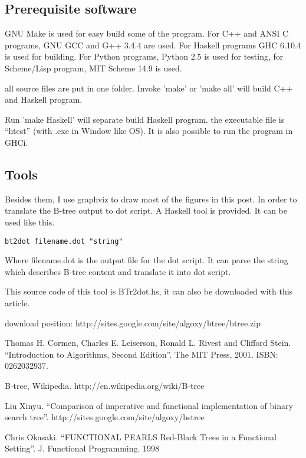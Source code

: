\documentclass{article}
\begin{document}
\subsection{Prerequisite software}
GNU Make is used for easy build some of the program. For C++ and ANSI C programs,
GNU GCC and G++ 3.4.4 are used. 
For Haskell programs GHC 6.10.4 is used
for building. For Python programs, Python 2.5 is used for testing, for
Scheme/Lisp program, MIT Scheme 14.9 is used.

all source files are put in one folder. Invoke 'make' or 'make all'
will build C++ and Haskell program. 

Run 'make Haskell' will separate build Haskell program. the executable
file is ``htest'' (with .exe
in Window like OS). It is also possible to run the program in GHCi.

\subsection{Tools}

Besides them, I use graphviz to draw most of the figures in this post. In order to
translate the B-tree output to dot script. A Haskell tool is provided.
It can be used like this.

\begin{verbatim}
bt2dot filename.dot "string"
\end{verbatim}

Where filename.dot is the output file for the dot script. It can
parse the string which describes B-tree content and translate it 
into dot script.

This source code of this tool is BTr2dot.hs, it can also be downloaded 
with this article.

download position: http://sites.google.com/site/algoxy/btree/btree.zip

\begin{thebibliography}{99}

Thomas H. Cormen, Charles E. Leiserson, Ronald L. Rivest and Clifford Stein. ``Introduction to Algorithms, Second Edition''. The MIT Press, 2001. ISBN: 0262032937.

B-tree, Wikipedia. http://en.wikipedia.org/wiki/B-tree

Liu Xinyu. ``Comparison of imperative and functional implementation of
binary search tree''. http://sites.google.com/site/algoxy/bstree

Chris Okasaki. ``FUNCTIONAL PEARLS Red-Black Trees in a Functional Setting''. J. Functional Programming. 1998

\end{thebibliography}

\ifx\wholebook\relax \else
\end{document}
